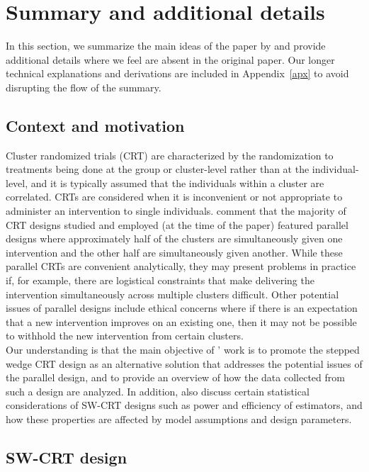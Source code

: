 \documentclass[10pt]{article}
\begin{document}
\section{Summary and additional details} \label{sec:summary}

In this section, we summarize the main ideas of the paper by \textcite{Hussey:2007} and provide additional details where we feel are absent in the original paper. Our longer technical explanations and derivations are included in Appendix~\ref{apx} to avoid disrupting the flow of the summary.

\subsection{Context and motivation}

Cluster randomized trials (CRT) are characterized by the randomization to treatments being done at the group or cluster-level rather than at the individual-level, and it is typically assumed that the individuals within a cluster are correlated. CRTs are considered when it is inconvenient or not appropriate to administer an intervention to single individuals. \textcite{Hussey:2007} comment that the majority of CRT designs studied and employed (at the time of the paper) featured parallel designs where approximately half of the clusters are simultaneously given one intervention and the other half are simultaneously given another. While these parallel CRTs are convenient analytically, they may present problems in practice if, for example, there are logistical constraints that make delivering the intervention simultaneously across multiple clusters difficult. Other potential issues of parallel designs include ethical concerns where if there is an expectation that a new intervention improves on an existing one, then it may not be possible to withhold the new intervention from certain clusters.
\\

Our understanding is that the main objective of \citeauthor{Hussey:2007}' work is to promote the stepped wedge CRT design as an alternative solution that addresses the potential issues of the parallel design, and to provide an overview of how the data collected from such a design are analyzed. In addition, \citeauthor{Hussey:2007} also discuss certain statistical considerations of SW-CRT designs such as power and efficiency of estimators, and how these properties are affected by model assumptions and design parameters.

\subsection{SW-CRT design}
\end{document}

